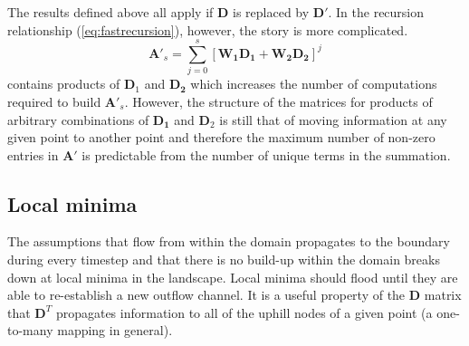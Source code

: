 \documentclass[draft,jgrga]{agu_template/AGUTeX}
\begin{document}
The results defined above all apply if $\bm{D}$ is replaced by $\bm{D'}$. In the recursion relationship (\ref{eq:fastrecursion}), however, the story is more complicated. \begin{equation}
    \bm{A'}_s = \sum_{j=0}^{s} \left[  \bm{\bm{W}_1 D_1 + \bm{W}_2 D_2} \right]^j
\end{equation}
contains products of $\bm{D}_1$ and $\bm{D_2}$ which increases the number of computations required to build $\bm{A'}_s$. However, the structure of the matrices for products of arbitrary combinations of $\bm{D_1}$ and $\bm{D}_2$ is still that of moving information at any given point to another point and therefore the maximum number of non-zero entries in $\bm{A'}$ is predictable from the number of unique terms in the summation.

\subsection{Local minima}

The assumptions that flow from within the domain propagates to the boundary during every timestep and that there is no build-up within the domain breaks down at local minima in the landscape. Local minima should flood until they are able to re-establish a new outflow channel. It is a useful property of the $\bm{D}$ matrix that $\bm{D}^T$ propagates information to all of the uphill nodes of a given point (a one-to-many mapping in general).
\end{document}
